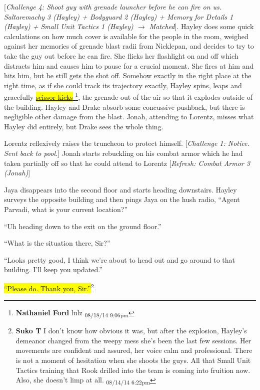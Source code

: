 {[}\textit{Challenge 4: Shoot guy with grenade launcher before he can fire on us.  Saltaremachy 3 (Hayley) + Bodyguard 2 (Hayley) + Memory for Details 1 (Hayley) + Small Unit Tactics 1 (Hayley) $\rightarrow$ Matched}{]}.  Hayley does some quick calculations on how much cover is available for the people in the room, weighed against her memories of grenade blast radii from Nicklepan, and decides to try to take the guy out before he can fire.  She flicks her flashlight on and off which distracts him and causes him to pause for a crucial moment.  She fires at him and hits him, but he still gets the shot off.  Somehow exactly in the right place at the right time, as if she could track its trajectory exactly, Hayley spins, leaps and gracefully \underline{  {\color[RGB]{17,85,204}\hl{scissor kicks}}  }\footnote{\textbf{Nathaniel Ford }lulz \textsubscript{08/18/14 9:06pm}}, the grenade out of the air so that it explodes outside of the building.  Hayley and Drake absorb some concussive pushback, but there is negligible other damage from the blast.  Jonah, attending to Lorentz, misses what Hayley did entirely, but Drake sees the whole thing.



Lorentz reflexively raises the truncheon to protect himself.  {[}\textit{Challenge 1: Notice. Sent back to pool.}{]}  Jonah starts rebuckling on his combat armor which he had taken partially off so that he could attend to Lorentz {[}\textit{Refresh: Combat Armor 3 (Jonah)}{]}



Jaya disappears into the second floor and starts heading downstairs.  Hayley surveys the opposite building and then pings Jaya on the hush radio, ``Agent Parvadi, what is your current location?''

``Uh heading down to the exit on the ground floor.''

``What is the situation there, Sir?''

``Looks pretty good, I think we're about to head out and go around to that building.  I'll keep you updated.''

\hl{``Please do. Thank you, Sir.''}\footnote{\textbf{Suko T }I don't know how obvious it was, but after the explosion, Hayley's demeanor changed from the weepy mess she's been the last few sessions.  Her movements are confident and assured, her voice calm and professional.  There is not a moment of hesitation when she shoots the guys.  All that Small Unit Tactics training that Rook drilled into the team is coming into fruition now.  Also, she doesn't limp at all. \textsubscript{08/14/14 6:22pm}}



